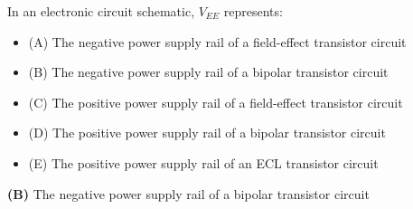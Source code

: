 

In an electronic circuit schematic, $V_{EE}$ represents:

\begin{itemize}
\item{(A)} The negative power supply rail of a field-effect transistor circuit
\vskip 5pt 
\item{(B)} The negative power supply rail of a bipolar transistor circuit
\vskip 5pt 
\item{(C)} The positive power supply rail of a field-effect transistor circuit
\vskip 5pt 
\item{(D)} The positive power supply rail of a bipolar transistor circuit
\vskip 5pt 
\item{(E)} The positive power supply rail of an ECL transistor circuit
\end{itemize}







{\bf (B)} The negative power supply rail of a bipolar transistor circuit
 










